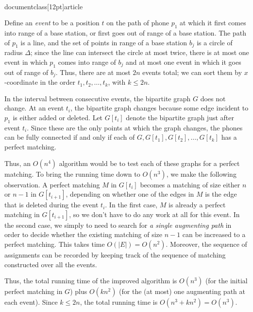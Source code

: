 \\documentclass[12pt]{article}
\begin{document}
\begin{enumerate}
{Define an {\em event} to be a position $t$ on the path of phone $p_1$ 
at which it first comes into range of a base station, 
or first goes out of range of a base station.
The path of $p_1$ is a line, and 
the set of points in range of a base station
$b_j$ is a circle of radius $\Delta$;
since the line can intersect the circle at most twice,
there is at most one event in which $p_1$ comes into range of $b_j$
and at most one event in which it goes out of range of $b_j$.
Thus, there are at most $2n$ events total; we
can sort them by $x$-coordinate in the order $t_1, t_2, \ldots, t_k$,
with $k \leq 2n$.

In the interval between consecutive events, 
the bipartite graph $G$ does not change.
At an event $t_i$, the bipartite graph changes because some
edge incident to $p_1$ is either added or deleted.
Let $G[t_i]$ denote the bipartite graph just after event $t_i$.
Since these are the only points at which the graph changes,
the phones can be fully connected if and only if 
each of $G, G[t_1], G[t_2], \ldots, G[t_k]$ has a perfect matching.

Thus, an $O(n^4)$ algorithm would be to test each of
these graphs for a perfect matching.
To bring the running time down to $O(n^3)$, we make
the following observation.
A perfect matching $M$ in $G[t_i]$ becomes a matching
of size either $n$ or $n-1$ in $G[t_{i+1}]$,
depending on whether one of the edges in $M$ 
is the edge that is deleted during the event $t_i$.
In the first case, $M$ is already a perfect matching in $G[t_{i+1}]$,
so we don't have to do any work at all for this event.
In the second case, we simply to need to search for {\em a single 
augmenting path} in order to decide whether the
existing matching of size $n-1$ can be increased to a perfect matching.
This takes time $O(|E|) = O(n^2)$.
Moreover, the sequence of assignments can be recorded
by keeping track of the sequence of matching constructed
over all the events.

Thus, the total running time of the improved algorithm
is $O(n^3)$ (for the initial perfect matching in $G$)
plus $O(kn^2)$ (for the (at most) one augmenting path
at each event).
Since $k \leq 2n$, the total running time is $O(n^3 + kn^2) = O(n^3)$.

}


\end{enumerate}
\end{document}
